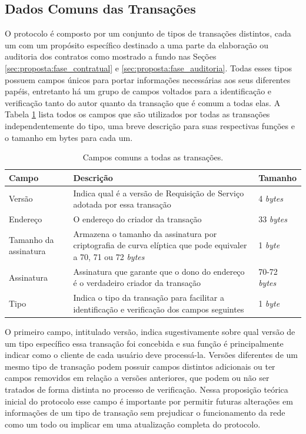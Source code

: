 \subsection{Dados Comuns das Transações}
\label{subsec:campos_comuns}

O protocolo é composto por um conjunto de tipos de transações distintos, cada um com um propósito específico destinado a uma parte da elaboração ou auditoria dos contratos como mostrado a fundo nas Seções \ref{sec:proposta:fase_contratual} e \ref{sec:proposta:fase_auditoria}. Todas esses tipos possuem campos únicos para portar informações necessárias aos seus diferentes papéis, entretanto há um grupo de campos voltados para a identificação e verificação tanto do autor quanto da transação que é comum a todas elas. A Tabela \ref{tabela:dados_comuns} lista todos os campos que são utilizados por todas as transações independentemente do tipo, uma breve descrição para suas respectivas funções e o tamanho em bytes para cada um.

\begin{table}[ht]
\centering
    \begin{tabular}{|m{}|m{}|m{}|}
    \hline
         \textbf{Campo} & \textbf{Descrição} & \textbf{Tamanho}  \\
         \hline
         Versão & Indica qual é a versão de Requisição de Serviço
         adotada por essa transação & 4 \textit{bytes} \\
         \hline
         Endereço & O endereço do criador da transação & 33 \textit{bytes} \\
         \hline
         Tamanho da assinatura & Armazena o tamanho da assinatura por criptografia de curva elíptica que pode equivaler a 70, 71 ou 72 \textit{bytes} & 1 \textit{byte} \\
         \hline
         Assinatura & Assinatura que garante que o dono do endereço é o verdadeiro criador da transação & 70-72 \textit{bytes} \\
         \hline
         Tipo & Indica o tipo da transação para facilitar a identificação e verificação dos campos seguintes & 1 \textit{byte} \\
    \hline
    \end{tabular}
    \caption{Campos comuns a todas as transações.}
    \label{tabela:dados_comuns}
\end{table}

O primeiro campo, intitulado versão, indica sugestivamente sobre qual versão de um tipo específico essa transação foi concebida e sua função é principalmente indicar como o cliente de cada usuário deve processá-la. Versões diferentes de um mesmo tipo de transação podem possuir campos distintos adicionais ou ter campos removidos em relação a versões anteriores, que podem ou não ser tratados de forma distinta no processo de verificação. Nessa proposição teórica inicial do protocolo esse campo é importante por permitir futuras alterações em informações de um tipo de transação sem prejudicar o funcionamento da rede como um todo ou implicar em uma atualização completa do protocolo.

